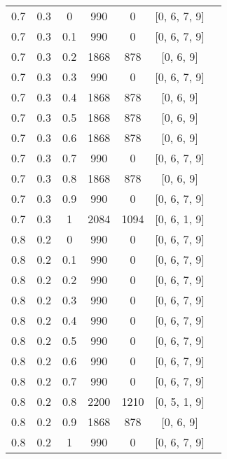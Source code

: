 \begin{table}[H]

	\label{tab:v6}
	\begin{center}

		\begin{tabular}{|c@{\hspace{7mm}}|c@{\hspace{7mm}}|c@{\hspace{7mm}}|c@{\hspace{7mm}}|c@{\hspace{7mm}}|c@{\hspace{7mm}}|c|}
\hline
0.7  & 0.3  & 0    & 990   & 0     & [0, 6, 7, 9]\\
0.7  & 0.3  & 0.1  & 990   & 0     & [0, 6, 7, 9]\\
0.7  & 0.3  & 0.2  & 1868  & 878   & [0, 6, 9]\\
0.7  & 0.3  & 0.3  & 990   & 0     & [0, 6, 7, 9]\\
0.7  & 0.3  & 0.4  & 1868  & 878   & [0, 6, 9]\\
0.7  & 0.3  & 0.5  & 1868  & 878   & [0, 6, 9]\\
0.7  & 0.3  & 0.6  & 1868  & 878   & [0, 6, 9]\\
0.7  & 0.3  & 0.7  & 990   & 0     & [0, 6, 7, 9]\\
0.7  & 0.3  & 0.8  & 1868  & 878   & [0, 6, 9]\\
0.7  & 0.3  & 0.9  & 990   & 0     & [0, 6, 7, 9]\\
0.7  & 0.3  & 1    & 2084  & 1094  & [0, 6, 1, 9]\\
0.8  & 0.2  & 0    & 990   & 0     & [0, 6, 7, 9]\\
0.8  & 0.2  & 0.1  & 990   & 0     & [0, 6, 7, 9]\\
0.8  & 0.2  & 0.2  & 990   & 0     & [0, 6, 7, 9]\\
0.8  & 0.2  & 0.3  & 990   & 0     & [0, 6, 7, 9]\\
0.8  & 0.2  & 0.4  & 990   & 0     & [0, 6, 7, 9]\\
0.8  & 0.2  & 0.5  & 990   & 0     & [0, 6, 7, 9]\\
0.8  & 0.2  & 0.6  & 990   & 0     & [0, 6, 7, 9]\\
0.8  & 0.2  & 0.7  & 990   & 0     & [0, 6, 7, 9]\\
0.8  & 0.2  & 0.8  & 2200  & 1210  & [0, 5, 1, 9]\\
0.8  & 0.2  & 0.9  & 1868  & 878   & [0, 6, 9]\\
0.8  & 0.2  & 1    & 990   & 0     & [0, 6, 7, 9]\\

\end{tabular}
\end{center}
\end{table}
